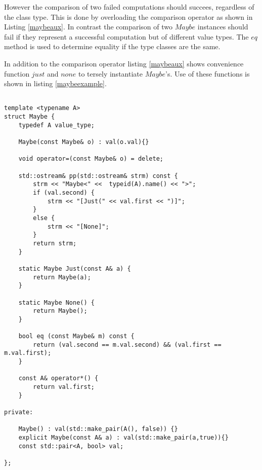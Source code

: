\documentclass[12pt,fleqn]{article}
\begin{document}
However the comparison of two failed computations should succees, regardless of the class type.
This is done by overloading the comparison operator as shown in Listing \ref{maybeaux}.
In contrast the comparison of two $Maybe$ instances should fail if they represent a successful computation but of different value types.
The $eq$ method is used to determine equality if the type classes are the same.

In addition to the comparison operator listing \ref{maybeaux} shows convenience function $just$ and $none$ to tersely instantiate $Maybe$'s.
Use of these functions is shown in listing \ref{maybeexample}.
%
%
%
%

\begin{minipage}{\linewidth}
\begin{lstlisting}[caption=Implementation of the Maybe class, label=maybe]

template <typename A>
struct Maybe {
	typedef A value_type;

	Maybe(const Maybe& o) : val(o.val){}

	void operator=(const Maybe& o) = delete;

 	std::ostream& pp(std::ostream& strm) const {
		strm << "Maybe<" <<  typeid(A).name() << ">";
		if (val.second) {
			strm << "[Just(" << val.first << ")]"; 
		}
		else {
			strm << "[None]";
		}
		return strm;
	}

	static Maybe Just(const A& a) {
		return Maybe(a);
	}

	static Maybe None() {
		return Maybe();
	}

	bool eq (const Maybe& m) const {
		return (val.second == m.val.second) && (val.first == m.val.first);
	}
	
	const A& operator*() {
		return val.first;
	}

private: 

	Maybe() : val(std::make_pair(A(), false)) {}
	explicit Maybe(const A& a) : val(std::make_pair(a,true)){}
	const std::pair<A, bool> val;

};
\end{lstlisting}
\end{minipage}

%
%
%

%
%
\end{document}
